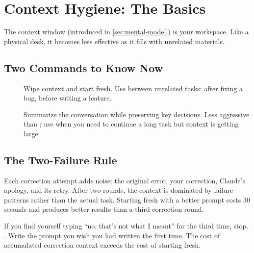 \section{Context Hygiene: The Basics}
\label{sec:context-basics}


The context window (introduced in \cref{sec:mental-model}) is your
workspace. Like a physical desk, it becomes less effective as it
fills with unrelated materials.

\subsection{Two Commands to Know Now}

\begin{description}
  \item[] Wipe context and start fresh.
    Use between unrelated tasks: after fixing a bug, before writing a feature.
  \item[] Summarize the conversation while preserving
    key decisions. Less aggressive than ;
    use when you need to continue a long task but context is getting large.
\end{description}

\subsection{The Two-Failure Rule}


Each correction attempt adds noise: the original error, your correction,
Claude's apology, and its retry. After two rounds, the context is
dominated by failure patterns rather than the actual task.
Starting fresh with a better prompt costs 30 seconds and produces
better results than a third correction round.

\begin{warnbox}
If you find yourself typing ``no, that's not what I meant'' for the
third time, stop. . Write the prompt you wish you had
written the first time. The cost of accumulated correction context
exceeds the cost of starting fresh.
\end{warnbox}


